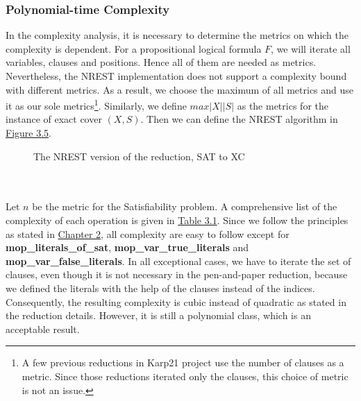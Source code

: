 \subsubsection{Polynomial-time Complexity}
In the complexity analysis, it is necessary to determine the metrics on which the complexity is dependent. For 
a propositional logical formula $F$, we will iterate all variables, clauses and positions. Hence all of them are needed as metrics. 
Nevertheless, the NREST implementation does not support a complexity bound with different metrics. 
As a result, we choose the maximum of all metrics and use it as our sole metrics\footnote{A few previous reductions in Karp21 project use the number of clauses 
as a metric. Since those reductions iterated only the clauses, this choice of metric is not an issue.}. Similarly, we define $max |X| |S|$ as the metrics 
for the instance of exact cover  $(X, S)$. Then we can define the NREST algorithm in \hyperref[fig:3.5]{Figure 3.5}.
\begin{figure}[!h]
    \centering
    \caption{The NREST version of the reduction, SAT to XC}
    \label{fig:3.5}
\end{figure}\\\\
Let $n$ be the metric for the Satisfiability problem.
A comprehensive list of the complexity of each operation is given in \hyperref[table:3.1]{Table 3.1}. 
Since we follow the principles as stated in \hyperref[para1]{Chapter 2}, all complexity are easy to follow 
except for \textbf{mop\_literals\_of\_sat}, \textbf{mop\_var\_true\_literals} and \textbf{mop\_var\_false\_literals}. 
In all exceptional cases, we have to iterate the set of clauses, even though it is not necessary in the pen-and-paper reduction, 
because we defined the literals with the help of the clauses instead of the indices. Consequently, the resulting 
complexity is cubic instead of quadratic as stated in the reduction details. However, it is still 
a polynomial class, which is an acceptable result.
